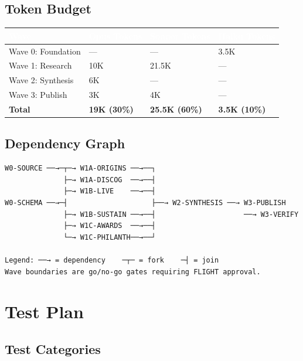 \documentclass[11pt,letterpaper]{article}
\newcommand{\tableheader}[1]{\textbf{\sffamily\textcolor{white}{#1}}}
\begin{document}
\subsection{Token Budget}

\begin{center}
\begin{tabularx}{\textwidth}{L{3cm}C{2cm}C{2cm}C{2cm}}
\toprule
{}
\tableheader{Wave} & \tableheader{Opus Tokens} & \tableheader{Sonnet Tokens} & \tableheader{Haiku Tokens} \\
\midrule
Wave 0: Foundation & --- & --- & 3.5K \\
Wave 1: Research & 10K & 21.5K & --- \\
Wave 2: Synthesis & 6K & --- & --- \\
Wave 3: Publish & 3K & 4K & --- \\
\midrule
\textbf{Total} & \textbf{19K (30\%)} & \textbf{25.5K (60\%)} & \textbf{3.5K (10\%)} \\
\bottomrule
\end{tabularx}
\end{center}

\subsection{Dependency Graph}

\begin{asciibox}
\begin{verbatim}
W0-SOURCE ──→─┬─→ W1A-ORIGINS ──→──┐
              ├─→ W1A-DISCOG  ──→──┤
              ├─→ W1B-LIVE    ──→──┤
W0-SCHEMA ──→─┤                    ├──→ W2-SYNTHESIS ──→ W3-PUBLISH
              ├─→ W1B-SUSTAIN ──→──┤                     ──→ W3-VERIFY
              ├─→ W1C-AWARDS  ──→──┤
              └─→ W1C-PHILANTH──→──┘

Legend: ──→ = dependency    ─┬─ = fork    ─┤ = join
Wave boundaries are go/no-go gates requiring FLIGHT approval.
\end{verbatim}
\end{asciibox}

\section{Test Plan}

\subsection{Test Categories}
\end{document}
